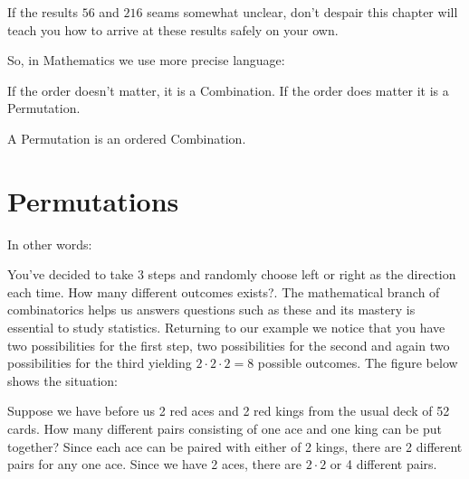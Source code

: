 If the results $56$ and $216$ seams somewhat unclear, don't despair this chapter will teach you how to arrive at these results safely on your own.


So, in Mathematics we use more precise language:

	If the order doesn't matter, it is a Combination.
	If the order does matter it is a Permutation.

A Permutation is an ordered Combination.

\section{Permutations}
In other words:

You've decided to take $3$ steps and randomly choose left or right as the direction each time. How many different outcomes exists?. The mathematical branch of combinatorics helps us answers questions such as these and its mastery is essential to study statistics. Returning to our example we notice that you have two possibilities for the first step, two possibilities for the second and again two possibilities for the third yielding $2 \cdot 2 \cdot 2 = 8$ possible outcomes. The figure below shows the situation:
\begin{figure}[H]
\centering
{}
\end{figure}

Suppose we have before us 2 red aces and 2 red kings from the usual deck of 52 cards. How many different pairs consisting of one ace and one king can be put together? Since each ace can be paired with either of 2 kings, there are 2 different pairs for any one ace. Since we have 2 aces, there are $2 \cdot 2$ or 4 different pairs.

